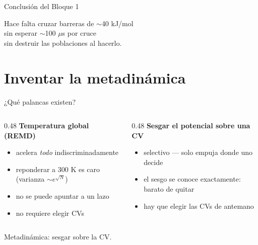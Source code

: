 \documentclass[aspectratio=169,11pt]{beamer}
\begin{document}
\begin{frame}{Conclusión del Bloque 1}
  \begin{center}
    \Large
    Hace falta cruzar barreras de $\sim$40 kJ/mol\\
    sin esperar $\sim$100 $\mu$s por cruce\\[0.6em]
    \alert{sin destruir las poblaciones al hacerlo.}
  \end{center}
\end{frame}

\section{Inventar la metadinámica}

\begin{frame}{¿Qué palancas existen?}
  \begin{columns}[T]
    \begin{column}{0.48\textwidth}
      \textbf{Temperatura global (REMD)}
      \begin{itemize}
        \item[\textcolor{minaranja}{$-$}] acelera \emph{todo} indiscriminadamente
        \item[\textcolor{minaranja}{$-$}] reponderar a 300 K es caro (varianza $\sim e^{\sqrt{N}}$)
        \item[\textcolor{minaranja}{$-$}] no se puede apuntar a un lazo
        \item[\textcolor{teal}{$+$}] no requiere elegir CVs
      \end{itemize}
    \end{column}
    \begin{column}{0.48\textwidth}
      \textbf{Sesgar el potencial sobre una CV}
      \begin{itemize}
        \item[\textcolor{teal}{$+$}] selectivo — solo empuja donde uno decide
        \item[\textcolor{teal}{$+$}] el sesgo se conoce exactamente: barato de quitar
        \item[\textcolor{minaranja}{$-$}] hay que \alert{elegir} las CVs de antemano
      \end{itemize}
    \end{column}
  \end{columns}
  \vspace{1em}
  \centering \alert{\large Metadinámica: sesgar sobre la CV.}
\end{frame}
\end{document}
